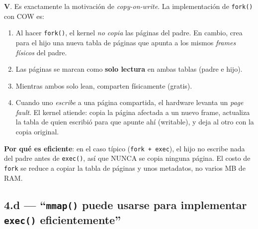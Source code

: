 \documentclass[11pt,a4paper]{article}
\begin{document}
\begin{respuesta}
\textbf{V}. Es exactamente la motivación de \emph{copy-on-write}.
La implementación de \texttt{fork()} con COW es:

\begin{enumerate}[leftmargin=*,nosep]
    \item Al hacer \texttt{fork()}, el kernel \emph{no copia} las
        páginas del padre. En cambio, crea para el hijo una nueva
        tabla de páginas que apunta a los mismos \emph{frames
        físicos} del padre.
    \item Las páginas se marcan como \textbf{solo lectura} en
        ambas tablas (padre e hijo).
    \item Mientras ambos solo lean, comparten físicamente (gratis).
    \item Cuando uno \emph{escribe} a una página compartida, el
        hardware levanta un \emph{page fault}. El kernel atiende:
        copia la página afectada a un nuevo frame, actualiza la
        tabla de quien escribió para que apunte ahí (writable), y
        deja al otro con la copia original.
\end{enumerate}

\textbf{Por qué es eficiente}: en el caso típico (\texttt{fork +
exec}), el hijo no escribe nada del padre antes de
\texttt{exec()}, así que NUNCA se copia ninguna página. El costo de
\texttt{fork} se reduce a copiar la tabla de páginas y unos
metadatos, no varios MB de RAM.
\end{respuesta}

\subsection*{4.d --- ``\texttt{mmap()} puede usarse para implementar \texttt{exec()} eficientemente''}
\end{document}
